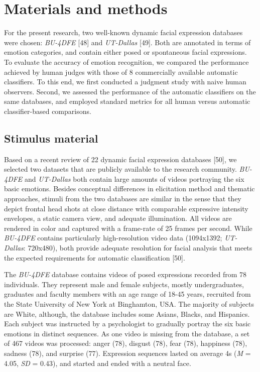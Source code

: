 \documentclass[10pt,letterpaper]{article}
\begin{document}
\hypertarget{materials-and-methods}{%
\section*{Materials and methods}\label{materials-and-methods}}

For the present research, two well-known dynamic facial expression databases were chosen: \emph{BU-4DFE} {[}48{]} and \emph{UT-Dallas} {[}49{]}. Both are annotated in terms of emotion categories, and contain either posed or spontaneous facial expressions. To evaluate the accuracy of emotion recognition, we compared the performance achieved by human judges with those of 8 commercially available automatic classifiers. To this end, we first conducted a judgment study with naive human observers. Second, we assessed the performance of the automatic classifiers on the same databases, and employed standard metrics for all human versus automatic classifier-based comparisons.

\hypertarget{stimulus-material}{%
\subsection*{Stimulus material}\label{stimulus-material}}

Based on a recent review of 22 dynamic facial expression databases {[}50{]}, we selected two datasets that are publicly available to the research community. \emph{BU-4DFE} and \emph{UT-Dallas} both contain large amounts of videos portraying the six basic emotions. Besides conceptual differences in elicitation method and thematic approaches, stimuli from the two databases are similar in the sense that they depict frontal head shots at close distance with comparable expressive intensity envelopes, a static camera view, and adequate illumination. All videos are rendered in color and captured with a frame-rate of 25 frames per second. While \emph{BU-4DFE} contains particularly high-resolution video data (1094x1392; \emph{UT-Dallas}: 720x480), both provide adequate resolution for facial analysis that meets the expected requirements for automatic classification {[}50{]}.

The \emph{BU-4DFE} database contains videos of posed expressions recorded from 78 individuals. They represent male and female subjects, mostly undergraduates, graduates and faculty members with an age range of 18-45 years, recruited from the State University of New York at Binghamton, USA. The majority of subjects are White, although, the database includes some Asians, Blacks, and Hispanics. Each subject was instructed by a psychologist to gradually portray the six basic emotions in distinct sequences. As one video is missing from the database, a set of 467 videos was processed: anger (78), disgust (78), fear (78), happiness (78), sadness (78), and surprise (77). Expression sequences lasted on average 4s (\textit{M} = 4.05, \textit{SD} = 0.43), and started and ended with a neutral face.
\end{document}
